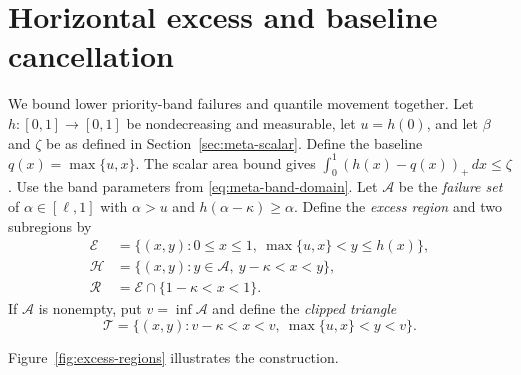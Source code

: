 \section{Horizontal excess and baseline cancellation}
We bound lower priority-band failures and quantile movement together.
Let $h:[0,1]\to[0,1]$ be nondecreasing and measurable, let $u=h(0)$, and let
$\beta$ and $\zeta$ be as defined in Section~\ref{sec:meta-scalar}.
Define the baseline $q(x)=\max\{u,x\}$. The scalar area bound gives
$\int_0^1(h(x)-q(x))_+\,dx\le\zeta$.
Use the band parameters from \eqref{eq:meta-band-domain}.
Let $\mathcal A$ be the \emph{failure set} of $\alpha\in[\ell,1]$ with
$\alpha>u$ and $h(\alpha-\kappa)\ge\alpha$. Define the \emph{excess region}
and two subregions by
\begin{align*}
 \mathcal E&=\{(x,y):0\le x\le1,\ \max\{u,x\}<y\le h(x)\},\\
 \mathcal H&=\{(x,y):y\in\mathcal A,\ y-\kappa<x<y\},\\
 \mathcal R&=\mathcal E\cap\{1-\kappa<x<1\}.
\end{align*}
If $\mathcal A$ is nonempty, put $v=\inf\mathcal A$ and define the
\emph{clipped triangle}
\[
 \mathcal T=\{(x,y):v-\kappa<x<v,\ \max\{u,x\}<y<v\}.
\]

Figure~\ref{fig:excess-regions} illustrates the construction.

